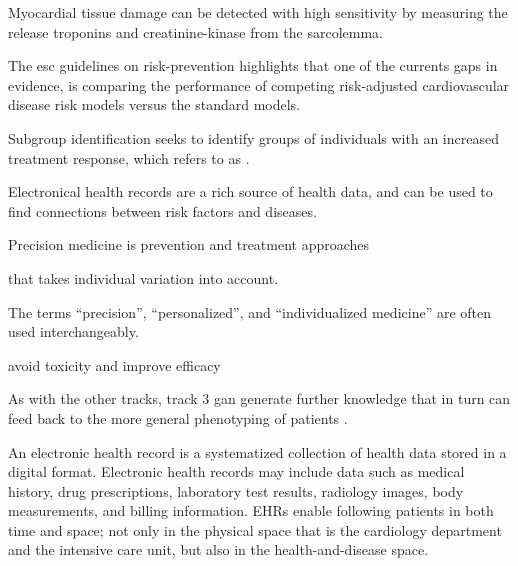 Myocardial tissue damage can be detected with high sensitivity by measuring 
the release troponins and creatinine-kinase from the sarcolemma.
~\autocite{falkPathogenesis2006}

The esc guidelines on risk-prevention highlights 
that one of the currents gaps in evidence,
is comparing the performance of competing risk-adjusted 
cardiovascular disease risk models versus the standard models.
~\autocite{visseren20212021}


Subgroup identification seeks to identify groups of individuals with an
increased treatment response, which
\citeauthor{kosorokPrecision2019} refers to as 
.


Electronical health records are a rich source of health data,
and can be used to find connections between risk factors and diseases.

Precision medicine is prevention and treatment approaches

that takes individual variation into account.


The terms
\enquote{precision},
\enquote{personalized},
and \enquote{individualized medicine}
are often used interchangeably.

avoid toxicity and improve efficacy



As with the other tracks, track 3 gan generate further knowledge 
that in turn can feed back to the more general phenotyping of patients
\autocite{konigWhat2017}. 

An electronic health record
is a systematized collection of health data 
stored in a digital format.
Electronic health records may include data such as
medical history, drug prescriptions, laboratory test results,
radiology images, body measurements, and billing information.
EHRs enable following patients in both time and space;
not only in the physical space that is the cardiology department
and the intensive care unit, but also in the health-and-disease space.

